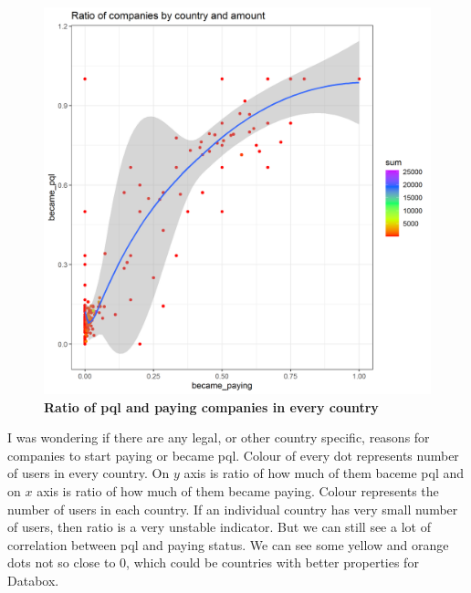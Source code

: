 \documentclass[fleqn,moreauthors,10pt]{ds_report}
\begin{document}
\begin{figure}[H]\centering
	\includegraphics[width=\linewidth]{ratio_paye_pql_county.png}
	\caption{\textbf{Ratio of pql and paying companies in every country}  }
	\label{fig:ratio_pql_paying}
\end{figure}

I was wondering if there are any legal, or other country specific, reasons for companies to start paying or became pql. Colour of every dot represents number of users in every country.  On $y$ axis is ratio of how much of them baceme pql and on $x$ axis is ratio of how much of them became paying. Colour represents the number of users in each country. If an individual country has very small number of users, then ratio is a very unstable indicator. But we can still see a lot of correlation between pql and paying status. We can see some yellow and orange dots not so close to 0, which could be countries with better properties for Databox.


\end{document}
